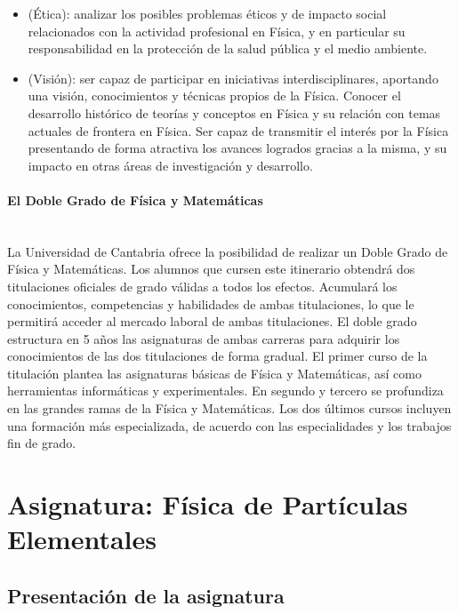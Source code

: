 \begin{itemize}
\item (Ética): analizar los posibles problemas éticos y de impacto social relacionados con la actividad profesional en Física, y en particular su responsabilidad en la protección de la salud pública y el medio ambiente.

\item (Visión): ser capaz de participar en iniciativas interdisciplinares, aportando una visión, conocimientos y técnicas propios de la Física. Conocer el desarrollo histórico de teorías y conceptos en Física y su relación con temas actuales de frontera en Física. Ser capaz de transmitir el interés por la Física presentando de forma atractiva los avances logrados gracias a la misma, y su impacto en otras áreas de investigación y desarrollo.
\end{itemize}

\paragraph{El Doble Grado de Física y Matemáticas\\\\}

La Universidad de Cantabria ofrece la posibilidad de realizar un Doble Grado de Física y Matemáticas. Los alumnos que cursen este itinerario obtendrá dos titulaciones oficiales de grado válidas a todos los efectos. Acumulará los conocimientos, competencias y habilidades de ambas titulaciones, lo que le permitirá acceder al mercado laboral de ambas titulaciones. 
El doble grado estructura en 5 años las asignaturas de ambas carreras para adquirir los conocimientos de las dos titulaciones de forma gradual. El primer curso de la titulación plantea las asignaturas básicas de Física y Matemáticas, así como herramientas informáticas y experimentales. En segundo y tercero se profundiza en las grandes ramas de la Física y Matemáticas. Los dos últimos cursos incluyen una formación más especializada, de acuerdo con las especialidades y los trabajos fin de grado. 

\section{Asignatura: Física de Partículas Elementales}

\subsection{Presentación de la asignatura}

